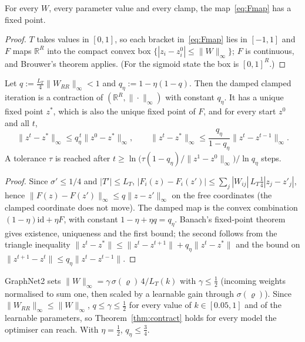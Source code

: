 \begin{proposition}[Existence]\label{prop:exist}
For every $W$, every parameter value and every clamp, the map~\eqref{eq:Fmap} has a fixed point.
\end{proposition}
\begin{proof}
$T$ takes values in $[0,1]$, so each bracket in~\eqref{eq:Fmap} lies in $[-1,1]$ and $F$ maps $\mathbb{R}^R$ into the compact convex box $\{|z_i-z_i^0|\le\|W\|_\infty\}$; $F$ is continuous, and Brouwer's theorem applies. (For the sigmoid state the box is $[0,1]^R$.)
\end{proof}

\begin{theorem}\label{thm:contract}
Let $q:=\tfrac{L_T}{4}\|W_{RR}\|_\infty<1$ and $q_\eta:=1-\eta(1-q)$. Then the damped clamped iteration is a contraction of $(\mathbb{R}^R,\|\cdot\|_\infty)$ with constant $q_\eta$. It has a unique fixed point $z^\ast$, which is also the unique fixed point of $F$, and for every start $z^0$ and all $t$,
\[
\|z^t-z^\ast\|_\infty\le q_\eta^{\,t}\|z^0-z^\ast\|_\infty,\qquad \|z^t-z^\ast\|_\infty\le\frac{q_\eta}{1-q_\eta}\|z^t-z^{t-1}\|_\infty .
\]
A tolerance $\tau$ is reached after $t\ge\ln\!\big(\tau(1-q_\eta)/\|z^1-z^0\|_\infty\big)/\ln q_\eta$ steps.
\end{theorem}
\begin{proof}
Since $\sigma'\le1/4$ and $|T'|\le L_T$, $|F_i(z)-F_i(z')|\le\sum_j|W_{ij}|\,L_T\tfrac14|z_j-z'_j|$, hence $\|F(z)-F(z')\|_\infty\le q\|z-z'\|_\infty$ on the free coordinates (the clamped coordinate does not move). The damped map is the convex combination $(1-\eta)\mathrm{id}+\eta F$, with constant $1-\eta+\eta q=q_\eta$. Banach's fixed-point theorem gives existence, uniqueness and the first bound; the second follows from the triangle inequality $\|z^t-z^\ast\|\le\|z^t-z^{t+1}\|+q_\eta\|z^t-z^\ast\|$ and the bound on $\|z^{t+1}-z^t\|\le q_\eta\|z^t-z^{t-1}\|$.
\end{proof}
\begin{corollary}\label{cor:cert}
GraphNet2 sets $\|W\|_\infty=\gamma\,\sigma(\varrho)\,4/L_T(k)$ with $\gamma\le\tfrac12$ (incoming weights normalised to sum one, then scaled by a learnable gain through $\sigma(\varrho)$). Since $\|W_{RR}\|_\infty\le\|W\|_\infty$, $q\le\gamma\le\tfrac12$ for every value of $k\in[0.05,1]$ and of the learnable parameters, so Theorem~\ref{thm:contract} holds for every model the optimiser can reach. With $\eta=\tfrac12$, $q_\eta\le\tfrac34$.
\end{corollary}


